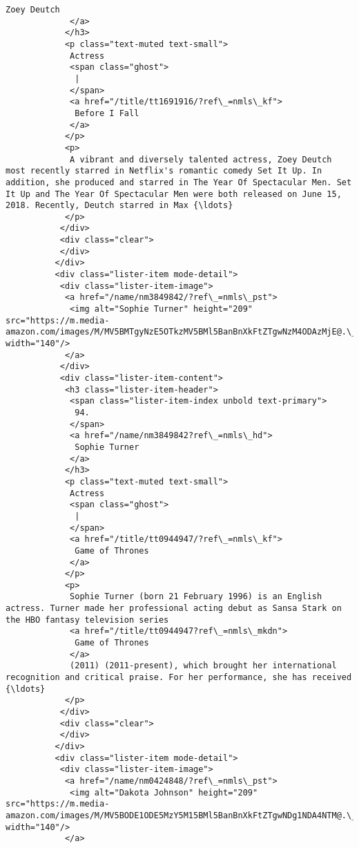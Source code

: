 \documentclass[11pt]{article}
\begin{document}
\begin{Verbatim}[commandchars=\\\{\}]
              Zoey Deutch
             </a>
            </h3>
            <p class="text-muted text-small">
             Actress
             <span class="ghost">
              |
             </span>
             <a href="/title/tt1691916/?ref\_=nmls\_kf">
              Before I Fall
             </a>
            </p>
            <p>
             A vibrant and diversely talented actress, Zoey Deutch most recently starred in Netflix's romantic comedy Set It Up. In addition, she produced and starred in The Year Of Spectacular Men. Set It Up and The Year Of Spectacular Men were both released on June 15, 2018. Recently, Deutch starred in Max {\ldots}
            </p>
           </div>
           <div class="clear">
           </div>
          </div>
          <div class="lister-item mode-detail">
           <div class="lister-item-image">
            <a href="/name/nm3849842/?ref\_=nmls\_pst">
             <img alt="Sophie Turner" height="209" src="https://m.media-amazon.com/images/M/MV5BMTgyNzE5OTkzMV5BMl5BanBnXkFtZTgwNzM4ODAzMjE@.\_V1\_UY209\_CR1,0,140,209\_AL\_.jpg" width="140"/>
            </a>
           </div>
           <div class="lister-item-content">
            <h3 class="lister-item-header">
             <span class="lister-item-index unbold text-primary">
              94.
             </span>
             <a href="/name/nm3849842?ref\_=nmls\_hd">
              Sophie Turner
             </a>
            </h3>
            <p class="text-muted text-small">
             Actress
             <span class="ghost">
              |
             </span>
             <a href="/title/tt0944947/?ref\_=nmls\_kf">
              Game of Thrones
             </a>
            </p>
            <p>
             Sophie Turner (born 21 February 1996) is an English actress. Turner made her professional acting debut as Sansa Stark on the HBO fantasy television series
             <a href="/title/tt0944947?ref\_=nmls\_mkdn">
              Game of Thrones
             </a>
             (2011) (2011-present), which brought her international recognition and critical praise. For her performance, she has received {\ldots}
            </p>
           </div>
           <div class="clear">
           </div>
          </div>
          <div class="lister-item mode-detail">
           <div class="lister-item-image">
            <a href="/name/nm0424848/?ref\_=nmls\_pst">
             <img alt="Dakota Johnson" height="209" src="https://m.media-amazon.com/images/M/MV5BODE1ODE5MzY5M15BMl5BanBnXkFtZTgwNDg1NDA4NTM@.\_V1\_UY209\_CR34,0,140,209\_AL\_.jpg" width="140"/>
            </a>

\end{Verbatim}
\end{document}
